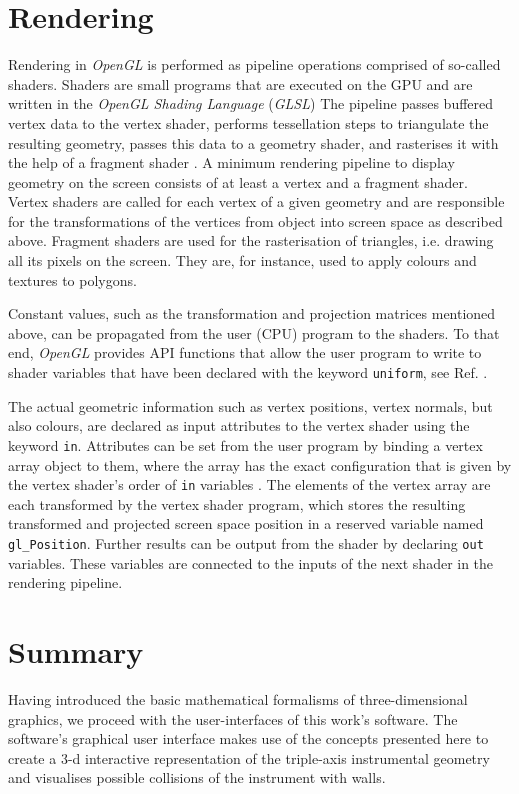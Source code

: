 \section{Rendering}
\label{sec:gl_shaders}
Rendering in \textit{OpenGL} is performed as pipeline operations comprised of so-called shaders.
Shaders are small programs that are executed on the GPU and are written in the
\textit{OpenGL Shading Language} (\textit{GLSL}) \cite{wiki_glsl}
The pipeline passes buffered vertex data to the vertex shader, performs tessellation steps to triangulate
the resulting geometry, passes this data to a geometry shader, and rasterises it with the help
of a fragment shader \cite[p. 6]{Sellers2002}.
A minimum rendering pipeline to display geometry on the screen consists of at least a vertex and
a fragment shader.
Vertex shaders are called for each vertex of a given geometry and are responsible for the transformations
of the vertices from object into screen space as described above.
Fragment shaders are used for the rasterisation of triangles, i.e. drawing all its pixels on the screen. 
They are, for instance, used to apply colours and textures to polygons.

Constant values, such as the transformation and projection matrices mentioned above, can be propagated from the 
user (CPU) program to the shaders. To that end, \textit{OpenGL} provides API functions that allow the user 
program to write to shader variables that have been declared with the keyword \lstinline[language=C]|uniform|,
see Ref. \cite[pp. 103-126]{Sellers2002}.

The actual geometric information such as vertex positions, vertex normals, but also colours, are declared as
input attributes to the vertex shader using the keyword \lstinline[language=C]|in|.
Attributes can be set from the user program by binding a vertex array object \cite{wiki_vao} to them,
where the array has the exact configuration that is given by the vertex shader's order of \lstinline[language=C]|in|
variables \cite[pp. 97-102]{Sellers2002}.
The elements of the vertex array are each transformed by the vertex shader program, which stores the resulting 
transformed and projected screen space position in a reserved variable named \lstinline[language=C]|gl_Position|.
Further results can be output from the shader by declaring \lstinline[language=C]|out| variables.
These variables are connected to the inputs of the next shader in the rendering pipeline.



\section{Summary}
Having introduced the basic mathematical formalisms of three-dimensional graphics, we proceed
with the user-interfaces of this work's software. The software's graphical user interface makes use of the 
concepts presented here to create a 3-d interactive representation of the triple-axis instrumental geometry
and visualises possible collisions of the instrument with walls.

